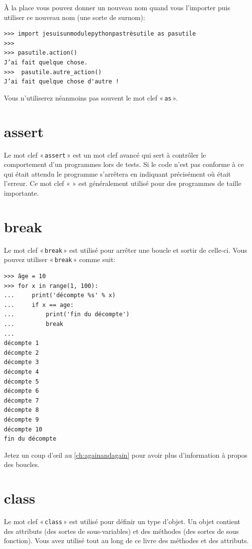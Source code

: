 À la place vous pouvez donner un nouveau nom quand vous l'importer puis utiliser ce nouveau nom (une sorte de surnom):

\begin{Verbatim}[frame=single,rulecolor=\color{gray}]
>>> import jesuisunmodulepythonpastrèsutile as pasutile
>>>
>>> pasutile.action()
J’ai fait quelque chose.
>>>  pasutile.autre_action()
J’ai fait quelque chose d'autre !
\end{Verbatim}

Vous n'utiliserez néanmoins pas souvent le mot clef « \texttt{as} ».

\section*{assert}

Le mot clef « \texttt{assert} » est un mot clef avancé qui sert à contrôler le comportement d'un programmes lors de tests. Si le code n'est pas conforme à ce qui était attendu le programme s'arrêtera en indiquant précisément où était l'erreur. Ce mot clef « \texttt{} » est généralement utilisé pour des programmes de taille importante.

\section*{break}
Le mot clef « \texttt{break} » est utilisé pour arrêter une boucle et sortir de celle-ci. Vous pouvez utiliser « \texttt{break} » comme suit:
\begin{Verbatim}[frame=single,rulecolor=\color{gray}]
>>> âge = 10
>>> for x in range(1, 100):
...     print('décompte %s' % x)
...     if x == age:
...         print('fin du décompte')
...         break
...
décompte 1
décompte 2
décompte 3
décompte 4
décompte 5
décompte 6
décompte 7
décompte 8
décompte 9
décompte 10
fin du décompte
\end{Verbatim}

Jetez un coup d'œil au \autoref{ch:againandagain} pour avoir plus d'information à propos des boucles.

\section*{class}

Le mot clef « \texttt{class} »  est utilisé pour définir un type d'objet. Un objet contient des attributs (des sortes de sous-variables) et des méthodes (des sortes de sous fonction). Vous avez utilisé tout au long de ce livre des méthodes et des attributs. 

